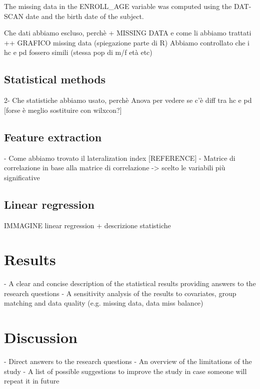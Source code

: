 \documentclass[]{article}
\begin{document}
\begin{multicols}{2}


The missing data in the ENROLL\_AGE variable was computed using the DAT-SCAN date and the birth date of the subject.



Che dati abbiamo escluso, perchè + MISSING DATA  e come li abbiamo trattati
++ GRAFICO missing data (spiegazione parte di R)
Abbiamo controllato che i hc e pd fossero simili (stessa pop di m/f età etc)
\subsection{Statistical methods}
2- Che statistiche abbiamo usato, perchè
Anova per vedere se c'è diff tra hc e pd [forse è meglio sostituire con wilxcon?]
\subsection{Feature extraction}
- Come abbiamo trovato il lateralization index [REFERENCE]
- Matrice di correlazione
in base alla matrice di correlazione ->  scelto le variabili più significative
\subsection{Linear regression}
IMMAGINE linear regression + descrizione statistiche 

\section{Results}

- A clear and concise description of the statistical results 
providing answers to the research questions
\newline
- A sensitivity analysis of the results to covariates, group matching and data quality (e.g. missing data, data miss balance)

\section{Discussion}

- Direct answers to the research questions
\newline
- An overview of the limitations of the study
\newline
- A list of possible suggestions to improve the study in case 
someone will repeat it in future

\end{multicols}

\printbibliography
\end{document}
